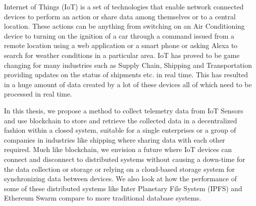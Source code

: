 \documentclass[11pt,openright]{report}
\begin{document}
\thesistitlepage
\copyrightpage

\newpage


\begin{thesisabstract}

Internet of Things (IoT) is a set of technologies that enable network connected devices to perform an action or share data among themselves or to a central location. These actions can be anything from switching on an Air Conditioning device to turning on the ignition of a car through a command issued from a remote location using a web application or a smart phone or asking Alexa to search for weather conditions in a particular area. IoT has proved to be game changing for many industries such as Supply Chain, Shipping and Transportation providing updates on the status of shipments etc. in real time. This has resulted in a huge amount of data created by a lot of these devices all of which need to be processed in real time. 

In this thesis, we propose a method to collect telemetry data from IoT Sensors and use blockchain to store and retrieve the collected data in a decentralized fashion within a closed system, suitable for a single enterprises or a group of companies in industries like shipping where sharing data with each other required. Much like blockchain, we envision a future where IoT devices can connect and disconnect to distributed systems without causing a down-time for the data collection or storage or relying on a cloud-based storage system for synchronizing data between devices. We also look at how the performance of some of these distributed systems like Inter Planetary File System (IPFS) and Ethereum Swarm compare to more traditional database systems.

\end{thesisabstract}


\end{document}
